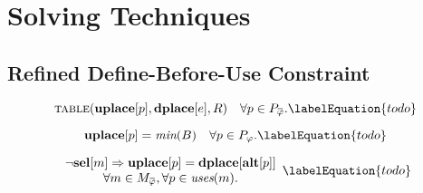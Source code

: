 %

\chapter{Solving Techniques}




\section{Refined Define-Before-Use Constraint}




%
%

\begin{equation}
  \mTable(\mVar{uplace}[p], \mVar{dplace}[e], \mDomMatrix)
  \mQuantSep
  \forall p \in \mPhiOperandCompSet.
  \labelEquation{todo}
\end{equation}

\begin{equation}
  \mVar{uplace}[p] = \mMin(\mBlockSet)
  \mQuantSep
  \forall p \in \mPhiOperandSet.
  \labelEquation{todo}
\end{equation}

\begin{equation}
  \begin{array}{c}
    \neg\mVar{sel}[m] \mImp \mVar{uplace}[p] = \mVar{dplace}[\mVar{alt}[p]] \\
    \forall m \in \mPhiMatchCompSet,
    \forall p \in \mUses(m).
  \end{array}
  \labelEquation{todo}
\end{equation}

